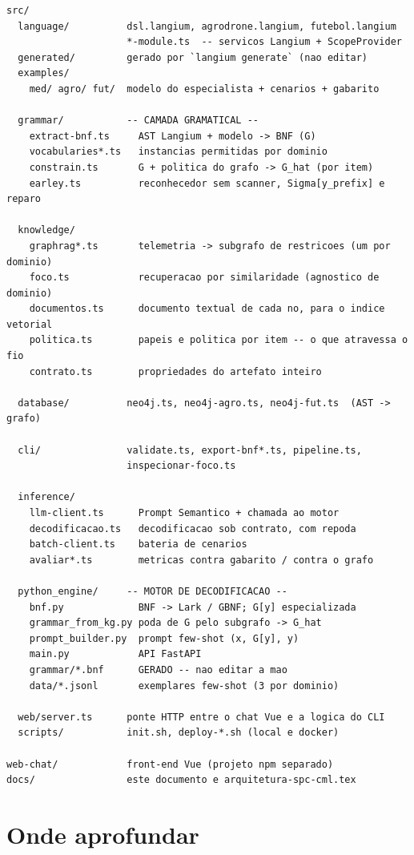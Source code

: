 \documentclass[11pt,a4paper]{article}
\begin{document}
\begin{lstlisting}
src/
  language/          dsl.langium, agrodrone.langium, futebol.langium
                     *-module.ts  -- servicos Langium + ScopeProvider
  generated/         gerado por `langium generate` (nao editar)
  examples/
    med/ agro/ fut/  modelo do especialista + cenarios + gabarito

  grammar/           -- CAMADA GRAMATICAL --
    extract-bnf.ts     AST Langium + modelo -> BNF (G)
    vocabularies*.ts   instancias permitidas por dominio
    constrain.ts       G + politica do grafo -> G_hat (por item)
    earley.ts          reconhecedor sem scanner, Sigma[y_prefix] e reparo

  knowledge/
    graphrag*.ts       telemetria -> subgrafo de restricoes (um por dominio)
    foco.ts            recuperacao por similaridade (agnostico de dominio)
    documentos.ts      documento textual de cada no, para o indice vetorial
    politica.ts        papeis e politica por item -- o que atravessa o fio
    contrato.ts        propriedades do artefato inteiro

  database/          neo4j.ts, neo4j-agro.ts, neo4j-fut.ts  (AST -> grafo)

  cli/               validate.ts, export-bnf*.ts, pipeline.ts,
                     inspecionar-foco.ts

  inference/
    llm-client.ts      Prompt Semantico + chamada ao motor
    decodificacao.ts   decodificacao sob contrato, com repoda
    batch-client.ts    bateria de cenarios
    avaliar*.ts        metricas contra gabarito / contra o grafo

  python_engine/     -- MOTOR DE DECODIFICACAO --
    bnf.py             BNF -> Lark / GBNF; G[y] especializada
    grammar_from_kg.py poda de G pelo subgrafo -> G_hat
    prompt_builder.py  prompt few-shot (x, G[y], y)
    main.py            API FastAPI
    grammar/*.bnf      GERADO -- nao editar a mao
    data/*.jsonl       exemplares few-shot (3 por dominio)

  web/server.ts      ponte HTTP entre o chat Vue e a logica do CLI
  scripts/           init.sh, deploy-*.sh (local e docker)

web-chat/            front-end Vue (projeto npm separado)
docs/                este documento e arquitetura-spc-cml.tex
\end{lstlisting}

\section{Onde aprofundar}
\end{document}
